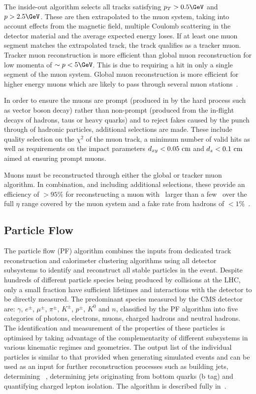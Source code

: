 The inside-out algorithm selects all tracks satisfying $p_T > 0.5\GeV$ and $p > 2.5\GeV$. These are then 
extrapolated to the muon system, taking into account effects from the magnetic field, multiple Coulomb scattering
in the detector material and the average expected energy loses. If at least one muon segment matches 
the extrapolated track, the track qualifies as a tracker muon. Tracker muon reconstruction is more efficient
than global muon reconstruction for low momenta of $\sim p< 5\GeV$. This is due
to requiring a hit in only a single segment of the muon system. Global muon reconstruction is 
more efficient for higher energy muons which are likely to pass through several muon stations~\cite{muon_reco}.

In order to ensure the muons are prompt (produced in by the hard process such as vector boson decay) rather
than non-prompt (produced from the in-flight decays of hadrons, taus or heavy quarks) and to reject fakes
caused by the punch through of hadronic particles, additional selections are made. These include quality
selection on the $\chi^2$ of the muon track, a minimum number of valid hits as well as requirements
on the impact parameters $d_{xy} < 0.05\,\,\text{cm}$ and $d_{z} < 0.1\,\,\text{cm}$ aimed at ensuring prompt muons.

Muons must be reconstructed through either the global or tracker muon algorithm. In combination, and
including additional selections, these provide an efficiency of $>95\%$ for reconstructing a muon 
with \pt~larger than a few \GeV~over the full $\eta$ range covered by the
muon system and a fake rate from hadrons of $<1\%$~\cite{muon_reco}.

\subsection{Particle Flow}
\label{sec:particle_flow}
The particle flow (PF) algorithm combines the inputs from dedicated track reconstruction and calorimeter clustering
algorithms using all detector subsystems to identify and reconstruct all stable particles in the event.
Despite hundreds of different particle species being produced by collisions at the LHC, only a small fraction
have sufficient lifetimes and interactions with the detector to be directly measured. The predominant species
measured by the CMS detector are: $\gamma$, $e^{\pm}$, $\mu^{\pm}$, $\pi^{\pm}$, $K^{\pm}$, $p^{\pm}$, $K^{0}$
and $n$, classified by the PF algorithm into five categories of photons, electrons, muons, charged hadrons and neutral hadrons. 
The identification and measurement of the properties of these particles is optimised by taking advantage of the complementarity of 
different subsystems in various kinematic regimes and geometries. The output list of the individual particles is similar to that provided
when generating simulated events and can be used as an input for further reconstruction processes
such as building jets, determining \met~, determining jets originating from bottom quarks (b tag) and quantifying
charged lepton isolation. The algorithm is described fully in~\cite{pf_proc,pf_pas}.

